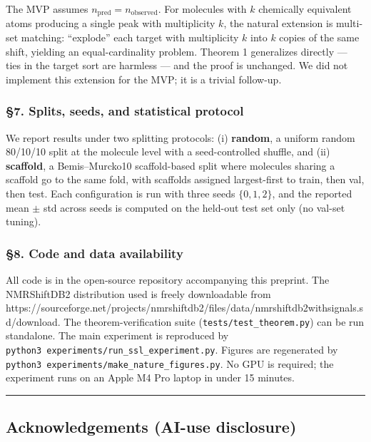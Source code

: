 \documentclass[
]{article}
\begin{document}
The MVP assumes \(n_{\text{pred}}=n_{\text{observed}}\). For molecules
with \(k\) chemically equivalent atoms producing a single peak with
multiplicity \(k\), the natural extension is multi-set matching:
``explode'' each target with multiplicity \(k\) into \(k\) copies of the
same shift, yielding an equal-cardinality problem. Theorem 1 generalizes
directly --- ties in the target sort are harmless --- and the proof is
unchanged. We did not implement this extension for the MVP; it is a
trivial follow-up.

\subsubsection{§7. Splits, seeds, and statistical
protocol}\label{splits-seeds-and-statistical-protocol}

We report results under two splitting protocols: (i) \textbf{random}, a
uniform random 80/10/10 split at the molecule level with a
seed-controlled shuffle, and (ii) \textbf{scaffold}, a Bemis--Murcko10
scaffold-based split where molecules sharing a scaffold go to the same
fold, with scaffolds assigned largest-first to train, then val, then
test. Each configuration is run with three seeds \(\{0,1,2\}\), and the
reported mean \(\pm\) std across seeds is computed on the held-out test
set only (no val-set tuning).

\subsubsection{§8. Code and data
availability}\label{code-and-data-availability}

All code is in the open-source repository accompanying this preprint.
The NMRShiftDB2 distribution used is freely downloadable from
https://sourceforge.net/projects/nmrshiftdb2/files/data/nmrshiftdb2withsignals.sd/download.
The theorem-verification suite (\texttt{tests/test\_theorem.py}) can be
run standalone. The main experiment is reproduced by
\texttt{python3\ experiments/run\_ssl\_experiment.py}. Figures are
regenerated by \texttt{python3\ experiments/make\_nature\_figures.py}.
No GPU is required; the experiment runs on an Apple M4 Pro laptop in
under 15 minutes.

\begin{center}\rule{0.5\linewidth}{0.5pt}\end{center}

\subsection{Acknowledgements (AI-use
disclosure)}\label{acknowledgements-ai-use-disclosure}
\end{document}
